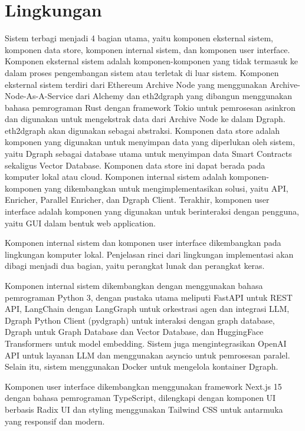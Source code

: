 \section{Lingkungan}
Sistem terbagi menjadi 4 bagian utama, yaitu komponen eksternal sistem, komponen data store, komponen internal sistem, dan komponen user interface. Komponen eksternal sistem adalah komponen-komponen yang tidak termasuk ke dalam proses pengembangan sistem atau terletak di luar sistem. Komponen eksternal sistem terdiri dari Ethereum Archive Node yang menggunakan Archive-Node-As-A-Service dari Alchemy dan eth2dgraph yang dibangun menggunakan bahasa pemrograman Rust dengan framework Tokio untuk pemrosesan asinkron dan digunakan untuk mengekstrak data dari Archive Node ke dalam Dgraph. eth2dgraph akan digunakan sebagai abstraksi. Komponen data store adalah komponen yang digunakan untuk menyimpan data yang diperlukan oleh sistem, yaitu Dgraph sebagai database utama untuk menyimpan data Smart Contracts sekaligus Vector Database. Komponen data store ini dapat berada pada komputer lokal atau cloud. Komponen internal sistem adalah komponen-komponen yang dikembangkan untuk mengimplementasikan solusi, yaitu API, Enricher, Parallel Enricher, dan Dgraph Client. Terakhir, komponen user interface adalah komponen yang digunakan untuk berinteraksi dengan pengguna, yaitu GUI dalam bentuk web application.

Komponen internal sistem dan komponen user interface dikembangkan pada lingkungan komputer lokal. Penjelasan rinci dari lingkungan implementasi akan dibagi menjadi dua bagian, yaitu perangkat lunak dan perangkat keras.

Komponen internal sistem dikembangkan dengan menggunakan bahasa pemrograman Python 3, dengan pustaka utama meliputi FastAPI untuk REST API, LangChain dengan LangGraph untuk orkestrasi agen dan integrasi LLM, Dgraph Python Client (pydgraph) untuk interaksi dengan graph database, Dgraph untuk Graph Database dan Vector Database, dan HuggingFace Transformers untuk model embedding. Sistem juga mengintegrasikan OpenAI API untuk layanan LLM dan menggunakan asyncio untuk pemrosesan paralel. Selain itu, sistem menggunakan Docker untuk mengelola kontainer Dgraph.

Komponen user interface dikembangkan menggunakan framework Next.js 15 dengan bahasa pemrograman TypeScript, dilengkapi dengan komponen UI berbasis Radix UI dan styling menggunakan Tailwind CSS untuk antarmuka yang responsif dan modern.

